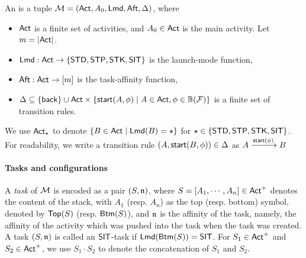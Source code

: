 \begin{definition} \label{def:afsm}
An {\AMASS} is a tuple ${\mathcal{M} } = ({\sf Act}, A_0, {\sf Lmd}, {\sf Aft}, \Delta)$, where 
\begin{itemize}
\item ${\sf Act}$ is a finite set of activities, and $A_0 \in {\sf Act}$ is the main activity. Let $m=|{\sf Act}|$.
\item ${\sf Lmd} : {\sf Act} \rightarrow \{{\sf STD},{\sf STP},{\sf STK},{\sf SIT}\}$ is the launch-mode function,
%
\item ${\sf Aft} : {\sf Act} \rightarrow [m]$ is the task-affinity function, 
%
\item $\Delta \subseteq \{{\mathsf{back} }\} \cup {\sf Act} \times \{{\mathsf{start} }(A,\phi)\mid A \in {\sf Act}, \phi \in \mathbb{B}(\mathcal{F})\}$ is a finite set of transition rules.
\end{itemize}
%
\end{definition}
We use ${\sf Act}_{\star}$ to denote $\{B\in{\sf Act}\mid {\sf Lmd}(B)= \star\}$ for $\star\in\{\mathsf{STD},\mathsf{STP},\mathsf{STK},\mathsf{SIT}\}$.
For readability, we write a transition rule $(A, {\mathsf{start} }(B, \phi))\in \Delta$ as $A \xrightarrow{{\mathsf{start} }(\phi)} B$





\paragraph{Tasks and configurations} A \emph{task} of ${\mathcal{M} }$ is encoded as a pair $(S, \mathfrak{n})$, where $S= [A_1, \cdots, A_n] \in {\sf Act}^+$ denotes the content of the stack, with $A_1$ (resp. $A_n$) as  the top (resp. bottom) symbol, denoted by $\mathsf{Top}(S)$ (resp. $\mathsf{Btm}(S)$), and $\mathfrak{n}$ is the affinity of the task, namely, the affinity of the activity which was pushed into the task when the task was created. A task $(S, \mathfrak{n})$ is called an $\mathsf{SIT}$-task if ${\sf Lmd}(\mathsf{Btm}(S)) = \mathsf{SIT}$.
For $S_1 \in {\sf Act}^+$ and $S_2 \in {\sf Act}^+$, we use $S_1 \cdot S_2$ to denote the concatenation of $S_1$ and $S_2$.

